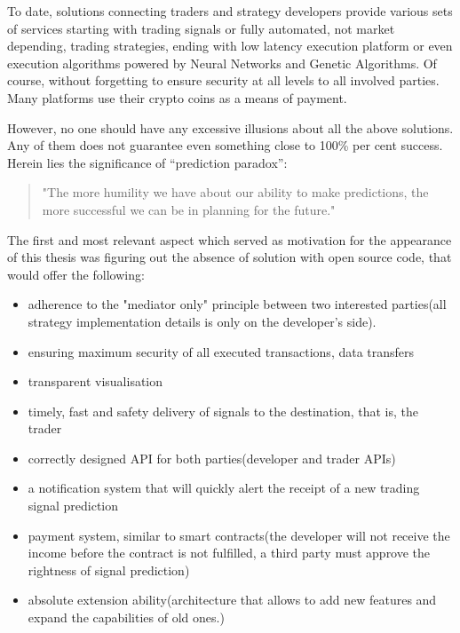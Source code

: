 \documentclass[thesis=B,english]{FITthesis}[2019/03/06]
\begin{document}
\addtocounter{footnote}{-2} %

To date, solutions connecting traders and strategy developers provide various sets of services starting with trading signals or fully automated, not market depending, trading strategies, ending with low latency execution platform or even execution algorithms powered by Neural Networks and Genetic Algorithms. Of course, without forgetting to ensure security at all levels to all involved parties. Many platforms use their crypto coins as a means of payment.

However, no one should have any excessive illusions about all the above solutions. Any of them does not guarantee even something close to 100\% per cent success. Herein lies the significance of  “prediction paradox”:

\begin{quote}
"The more humility we have about our ability to make predictions, the more successful we can be in planning for the future."\cite{silver_signal_2015}
\end{quote}

The first and most relevant aspect which served as motivation for the appearance of this thesis was figuring out the absence of solution with open source code, that would offer the following:
\begin{itemize}
  \item adherence to the "mediator only" principle between two interested parties(all strategy implementation details is only on the developer's side).
  \item ensuring maximum security of all executed transactions, data transfers
  \item transparent visualisation
  \item timely, fast and safety delivery of signals to the destination, that is, the trader
  \item correctly designed API for both parties(developer and trader APIs)
  \item a notification system that will quickly alert the receipt of a new trading signal prediction
  \item payment system, similar to smart contracts\footnotemark(the developer will not receive the income before the contract is not fulfilled, a third party must approve the rightness of signal prediction)
  \item absolute extension ability(architecture that allows to add new features and expand the capabilities of old ones.)
\end{itemize}
\end{document}
